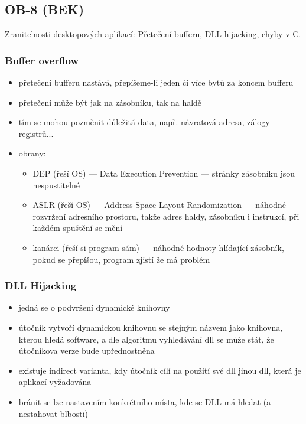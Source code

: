 \subsection{OB-8 (BEK)}
Zranitelnosti desktopových aplikací: Přetečení bufferu, DLL hijacking, chyby v C.

\subsubsection*{Buffer overflow}
\begin{itemize}
    \item přetečení bufferu nastává, přepíšeme-li jeden či více bytů za koncem bufferu
    \item přetečení může být jak na zásobníku, tak na haldě
    \item tím se mohou pozměnit důležitá data, např. návratová adresa, zálogy registrů...
    \item obrany:
    \begin{itemize}
        \item DEP (řeší OS) --- Data Execution Prevention --- stránky zásobníku jsou nespustitelné
        \item ASLR (řeší OS) --- Address Space Layout Randomization --- náhodné rozvržení adresního prostoru, takže adres haldy, zásobníku i instrukcí, při každém spuštění se mění
        \item kanárci (řeší si program sám) --- náhodné hodnoty hlídající zásobník, pokud se přepíšou, program zjistí že má problém
    \end{itemize}
\end{itemize}

\subsubsection*{DLL Hijacking}
\begin{itemize}
    \item jedná se o podvržení dynamické knihovny
    \item útočník vytvoří dynamickou knihovnu se stejným názvem jako knihovna, kterou hledá software, a dle algoritmu vyhledávání dll se může stát, že útočníkova verze bude upřednostněna
    \item existuje indirect varianta, kdy útočník cílí na použití své dll jinou dll, která je aplikací vyžadována
    \item bránit se lze nastavením konkrétního místa, kde se DLL má hledat (a nestahovat blbosti)
\end{itemize}

